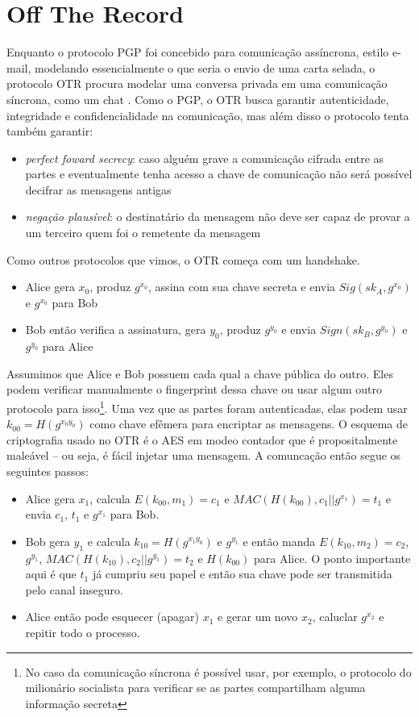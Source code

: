 \section{Off The Record}
\label{sec:otr}

Enquanto o protocolo PGP foi concebido para comunicação assíncrona, estilo e-mail, modelando essencialmente o que seria o envio de uma carta selada, o protocolo OTR procura modelar uma conversa privada em uma comunicação síncrona, como um chat \cite{Borisov04}.
Como o PGP, o OTR busca garantir autenticidade, integridade e confidencialidade na comunicação, mas além disso o protocolo tenta também garantir:
\begin{itemize}
\item {\em perfect foward secrecy}: caso alguém grave a comunicação cifrada entre as partes e eventualmente tenha acesso a chave de comunicação não será possível decifrar as mensagens antigas
\item {\em negação plausível}: o destinatário da mensagem não deve ser capaz de provar a um terceiro quem foi o remetente da mensagem
\end{itemize}

Como outros protocolos que vimos, o OTR começa com um handshake.
\begin{itemize}
\item Alice gera $x_0$, produz $g^{x_0}$, assina com sua chave secreta e envia $Sig(sk_A, g^{x_0})$ e $g^{x_0}$ para Bob
\item Bob então verifica a assinatura, gera $y_0$, produz $g^{y_0}$ e envia $Sign(sk_B, g^{y_0})$ e $g^{y_0}$ para Alice
\end{itemize}

Assumimos que Alice e Bob possuem cada qual a chave pública do outro.
Eles podem verificar manualmente o fingerprint dessa chave ou usar algum outro protocolo para isso\footnote{No caso da comunicação síncrona é possível usar, por exemplo, o protocolo do milionário socialista para verificar se as partes compartilham alguma informação secreta}.
Uma vez que as partes foram autenticadas, elas podem usar $k_{00} = H(g^{x_0y_0})$ como chave efêmera para encriptar as mensagens.
O esquema de criptografia usado no OTR é o AES em modeo contador que é propositalmente maleável -- ou seja, é fácil injetar uma mensagem.
A comuncação então segue os seguintes passos:
\begin{itemize}
\item Alice gera $x_1$, calcula $E(k_{00}, m_1) = c_1$ e $MAC(H(k_{00}), c_1 || g^{x_1}) = t_1 $ e envia $c_1$, $t_1$ e $g^{x_1}$ para Bob.
\item Bob gera $y_1$ e calcula $k_{10} = H(g^{x_1y_0})$ e $g^{y_1}$ e então manda $E(k_{10}, m_2) = c_2$, $g^{y_1}$, $MAC(H(k_{10}), c_2 || g^{y_1}) = t_2$ e $H(k_{00})$ para Alice.
O ponto importante aqui é que $t_1$ já cumpriu seu papel e então sua chave pode ser transmitida pelo canal inseguro. 
\item Alice então pode esquecer (apagar) $x_1$ e gerar um novo $x_2$, caluclar $g^{x_2}$ e repitir todo o processo.
\end{itemize}

